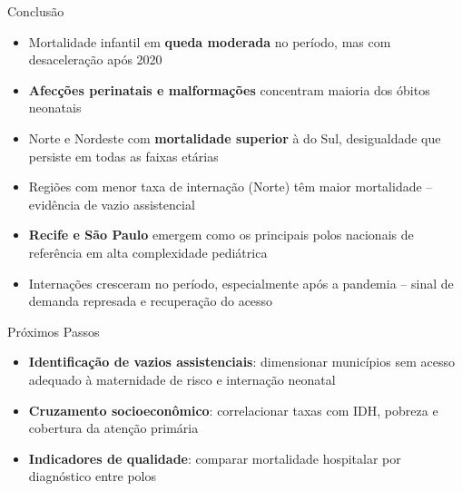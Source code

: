 \documentclass[
  ignorenonframetext,
  brazilian,
]{beamer}
\providecommand{\tightlist}{%
  \setlength{\itemsep}{0pt}\setlength{\parskip}{0pt}}
\begin{document}
\begin{frame}{Conclusão}
\protect{}\label{conclusuxe3o}
\begin{itemize}
\tightlist
\item
  Mortalidade infantil em \textbf{queda moderada} no período, mas com
  desaceleração após 2020
\item
  \textbf{Afecções perinatais e malformações} concentram maioria dos
  óbitos neonatais
\item
  Norte e Nordeste com \textbf{mortalidade superior} à do Sul,
  desigualdade que persiste em todas as faixas etárias
\item
  Regiões com menor taxa de internação (Norte) têm maior mortalidade --
  evidência de vazio assistencial
\item
  \textbf{Recife e São Paulo} emergem como os principais polos nacionais
  de referência em alta complexidade pediátrica
\item
  Internações cresceram no período, especialmente após a pandemia --
  sinal de demanda represada e recuperação do acesso
\end{itemize}
\end{frame}

\begin{frame}{Próximos Passos}
\protect{}\label{pruxf3ximos-passos}
\begin{itemize}
\tightlist
\item
  \textbf{Identificação de vazios assistenciais}: dimensionar municípios
  sem acesso adequado à maternidade de risco e internação neonatal
\item
  \textbf{Cruzamento socioeconômico}: correlacionar taxas com IDH,
  pobreza e cobertura da atenção primária
\item
  \textbf{Indicadores de qualidade}: comparar mortalidade hospitalar por
  diagnóstico entre polos
\end{itemize}
\end{frame}
\end{document}

